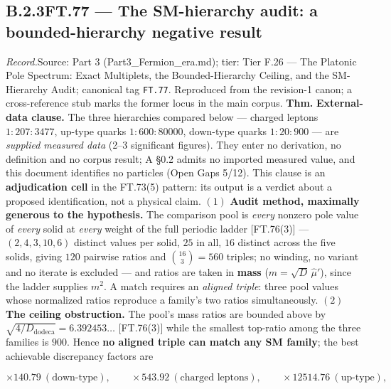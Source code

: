 \documentclass[11pt,openany]{report}
\theoremstyle{canonplain}
\theoremstyle{canondef}
\begin{document}
\subsection*{\texorpdfstring{B.2.3\quad FT.77 — The SM-hierarchy audit: a bounded-hierarchy negative result}{FT.77 B.2.3}}
\label{tag:FT-77}
{\small \textit{Record.}\quad Source: Part 3 (Part3\_Fermion\_era.md); tier: Tier F.26 — The Platonic Pole Spectrum: Exact Multiplets, the Bounded-Hierarchy Ceiling, and the SM-Hierarchy Audit; canonical tag \texttt{FT.77}. Reproduced from the revision-1 canon; a cross-reference stub marks the former locus in the main corpus.}
\medskip
\textbf{Thm.} \textbf{External-data clause.} The three hierarchies compared below — charged leptons $1{:}207{:}3477$, up-type quarks $1{:}600{:}80000$, down-type quarks $1{:}20{:}900$ — are \textit{supplied measured data} (2–3 significant figures). They enter no derivation, no definition and no corpus result; A §0.2 admits no imported measured value, and this document identifies no particles (Open Gaps 5/12). This clause is an \textbf{adjudication cell} in the FT.73(5) pattern: its output is a verdict about a proposed identification, not a physical claim. $(1)$ \textbf{Audit method, maximally generous to the hypothesis.} The comparison pool is \textit{every} nonzero pole value of \textit{every} solid at \textit{every} weight of the full periodic ladder [FT.76(3)] — $(2,4,3,10,6)$ distinct values per solid, $25$ in all, $16$ distinct across the five solids, giving $120$ pairwise ratios and $\binom{16}{3}=560$ triples; no winding, no variant and no iterate is excluded — and ratios are taken in \textbf{mass} ($m=\sqrt{D}\,\hat\mu'$), since the ladder supplies $m^2$. A match requires an \textit{aligned triple}: three pool values whose normalized ratios reproduce a family's two ratios simultaneously. $(2)$ \textbf{The ceiling obstruction.} The pool's mass ratios are bounded above by $\sqrt{4/D_{\mathrm{dodeca}}}=6.392453\ldots$ [FT.76(3)] while the smallest top-ratio among the three families is $900$. Hence \textbf{no aligned triple can match any SM family}; the best achievable discrepancy factors are

\[
\times140.79\ (\text{down-type}),\qquad\times543.92\ (\text{charged leptons}),\qquad\times12514.76\ (\text{up-type}),
\]
\end{document}
